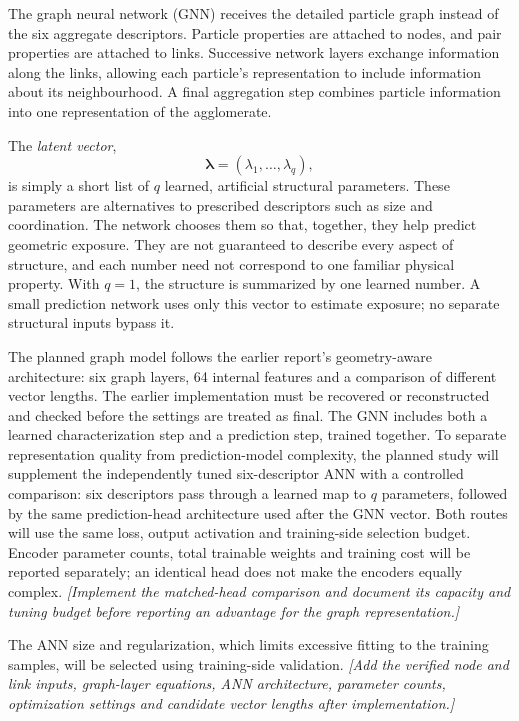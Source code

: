 \documentclass[11pt,a4paper]{article}
\newcommand{\pending}[1]{{\color{red}\textit{[#1]}}}
\begin{document}
The graph neural network (GNN) receives the detailed particle graph instead of the six aggregate descriptors. Particle properties are attached to nodes, and pair properties are attached to links. Successive network layers exchange information along the links, allowing each particle's representation to include information about its neighbourhood. A final aggregation step combines particle information into one representation of the agglomerate.

The \emph{latent vector},
\begin{equation}
 \boldsymbol{\lambda}=(\lambda_1,\ldots,\lambda_q),
\end{equation}
is simply a short list of $q$ learned, artificial structural parameters. These parameters are alternatives to prescribed descriptors such as size and coordination. The network chooses them so that, together, they help predict geometric exposure. They are not guaranteed to describe every aspect of structure, and each number need not correspond to one familiar physical property. With $q=1$, the structure is summarized by one learned number. A small prediction network uses only this vector to estimate exposure; no separate structural inputs bypass it.

The planned graph model follows the earlier report's geometry-aware architecture: six graph layers, 64 internal features and a comparison of different vector lengths. The earlier implementation must be recovered or reconstructed and checked before the settings are treated as final. The GNN includes both a learned characterization step and a prediction step, trained together. To separate representation quality from prediction-model complexity, the planned study will supplement the independently tuned six-descriptor ANN with a controlled comparison: six descriptors pass through a learned map to $q$ parameters, followed by the same prediction-head architecture used after the GNN vector. Both routes will use the same loss, output activation and training-side selection budget. Encoder parameter counts, total trainable weights and training cost will be reported separately; an identical head does not make the encoders equally complex. \pending{Implement the matched-head comparison and document its capacity and tuning budget before reporting an advantage for the graph representation.}

The ANN size and regularization, which limits excessive fitting to the training samples, will be selected using training-side validation. \pending{Add the verified node and link inputs, graph-layer equations, ANN architecture, parameter counts, optimization settings and candidate vector lengths after implementation.}
\end{document}
